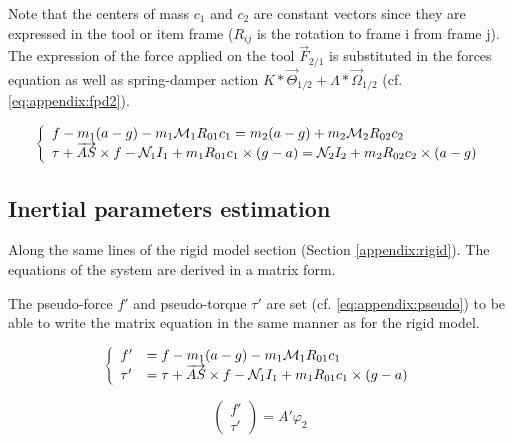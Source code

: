 \documentclass[\main/main.tex]{subfiles}
\begin{document}
Note that the centers of mass $c_1$ and $c_2$ are constant vectors since they are expressed in the tool or item frame ($R_{ij}$ is the rotation to frame i from frame j).  The expression of the force applied on the tool $\overrightarrow{F}_{2/1}$ is substituted in the forces equation as well as spring-damper action $K \ast \overrightarrow{\Theta}_{1/2} + \Lambda \ast \overrightarrow{\Omega}_{1/2}$ (cf. \ref{eq:appendix:fpd2}).

\begin{equation}
 \label{eq:appendix:fpd2}
 \left \{
 \begin{array}{l l}
  f - m_1 (a - g) -  m_1 \mathcal{M}_1 R_{01} c_1 = m_2 (a - g) + m_2 \mathcal{M}_2 R_{02} c_2 \\
  \tau + \overrightarrow{AS} \times f - \mathcal{N}_1 I_1 + m_1 R_{01} c_1 \times (g - a)
  = \mathcal{N}_2 I_2  + m_2 R_{02} c_2 \times  (a - g)
 \end{array}
 \right.
\end{equation}

\subsection{Inertial parameters estimation}
\label{appendix:msd:inertia_estimation}

Along the same lines of the rigid model section (Section \ref{appendix:rigid}). The equations of the system are derived in a matrix form.

The pseudo-force $f'$ and pseudo-torque $\tau'$ are set (cf. \ref{eq:appendix:pseudo}) to be able to write the matrix equation in the same manner as for the rigid model.

\begin{equation}
 \label{eq:appendix:pseudo}
 \left \{
 \begin{array}{l l}
   f' &= f - m_1 (a - g) -  m_1 \mathcal{M}_1 R_{01} c_1 \\
   \tau' &= \tau + \overrightarrow{AS} \times f - \mathcal{N}_1 I_1 + m_1 R_{01} c_1 \times (g - a)
 \end{array}
 \right.
\end{equation}

\begin{equation}
  \label{eq:appendix:rmsd_inertia_estimation}
\begin{pmatrix}
  f' \\ \tau'
\end{pmatrix} = A' \varphi_2
\end{equation}
\end{document}
